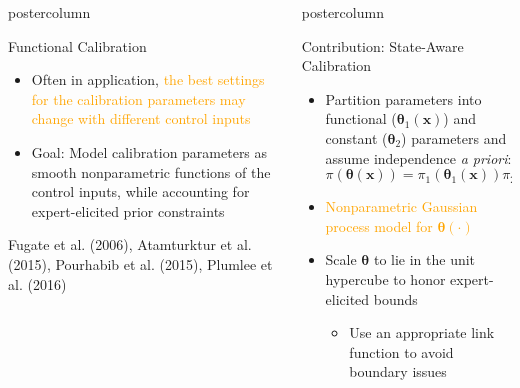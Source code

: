 \documentclass[final,10pt]{beamer}  %
\newcommand{\B}{\boldsymbol}  %
\newlength{\columnheight}
\begin{document}
\begin{frame}{}
\begin{columns}[t]
\begin{column}{.33\textwidth}
\begin{beamercolorbox}[center, wd=1.175\textwidth]{postercolumn}
\begin{minipage}[T]{\textwidth}
{\begin{block}{Functional Calibration}
{\begin{itemize}
              \item
              Often in application, \textcolor{orange}{the best settings for the calibration parameters may change with different control inputs}

              \item
              Goal: Model calibration parameters as smooth nonparametric functions of the control inputs, while accounting for expert-elicited prior constraints

          \end{itemize}
          }
          \hfill {\tiny Fugate et al. (2006), Atamturktur et al. (2015), Pourhabib et al. (2015), Plumlee et al. (2016)}
        \end{block}
        }
        \end{minipage}
        \end{beamercolorbox}
    \end{column}

    \begin{column}{.33\textwidth}
    \begin{beamercolorbox}[center,wd=1.325\textwidth]{postercolumn}
    \begin{minipage}[T]{\textwidth}
    \parbox[t][\columnheight]{\textwidth}{ %

        \begin{block}{Contribution: State-Aware Calibration}
            {\small
            \begin{itemize}\itemsep2ex
            \item
            Partition parameters into functional ($\B{\theta}_1(\B{x})$) and constant ($\B{\theta}_2$) parameters and assume independence {\em a priori}:
            \[
                \pi(\B{\theta}(\B{x})) = \pi_1(\B{\theta}_1(\B{x}))\pi_2(\B{\theta}_2)
            \]

            \item
            \textcolor{orange}{Nonparametric Gaussian process model for $\B{\theta}(\cdot)$}

            \item
            Scale $\B{\theta}$ to lie in the unit hypercube to honor expert-elicited bounds
            \begin{itemize}
                \item
                Use an appropriate link function to avoid boundary issues
            \end{itemize}
            \end{itemize}

}
\end{block}}
\end{minipage}
\end{beamercolorbox}
\end{column}
\end{columns}
\end{frame}
\end{document}
